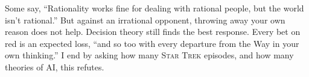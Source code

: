 Some say, ``Rationality works fine for dealing with rational people, but the world isn't rational.'' But against an irrational opponent, throwing away your own reason does not help. Decision theory still finds the best response. Every bet on red is an expected loss, ``and so too with every departure from the Way in your own thinking.'' I end by asking how many \textsc{Star Trek} episodes, and how many theories of AI, this refutes.
